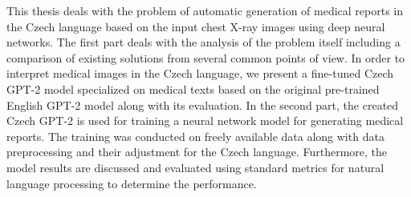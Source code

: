 \documentclass[12pt]{report}
\begin{document}

This thesis deals with the problem of automatic generation of medical reports in the Czech language based on the input chest X-ray images using deep neural networks. The first part deals with the analysis of the problem itself including a comparison of existing solutions from several common points of view. In order to interpret medical images in the Czech language, we present a fine-tuned Czech GPT-2 model specialized on medical texts based on the original pre-trained English GPT-2 model along with its evaluation. In the second part, the created Czech GPT-2 is used for training a neural network model for generating medical reports. The training was conducted on freely available data along with data preprocessing and their adjustment for the Czech language. Furthermore, the model results are discussed and evaluated using standard metrics for natural language processing to determine the performance.
\end{document}
